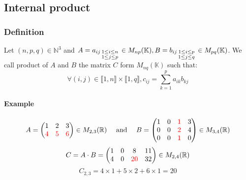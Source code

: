 \documentclass[notitlepage]{math}
\begin{document}
\subsection{Internal product}
\subsubsection{Definition}
Let $(n,p,q) \in \mathbb{N}^3$ and $A = {a_{ij}}_{\begin{smallmatrix} 1 \leq i \leq n \\ 1 \leq j \leq p \end{smallmatrix}} \in M_{np}(\mathbb{K}), B = {b_{ij}}_{\begin{smallmatrix}1 \leq i \leq p \\1 \leq j \leq q\end{smallmatrix}} \in M_{pq}(\mathbb{K})$.
We call product of $A$ and $B$ the matrix $C$ form $M_{nq}(\mathbb{K})$ such that:
\[ \forall (i,j) \in \llbracket 1,n \rrbracket \times \llbracket 1,q \rrbracket, c_{ij} = \sum_{k=1}^{p} a_{ik}b_{kj}\]

\paragraph{Example}
\[
    A = \begin{pmatrix}
        1 & 2 & 3 \\
        \color{red} 4 & \color{red}5 & \color{red}6
    \end{pmatrix} \in M_{2,3}(\mathbb{R}) \quad \text{ and } \quad B = \begin{pmatrix}
        1 & 0 & \color{red}1 & 3 \\
        0 & 0 & \color{red}2 & 4 \\
        0 & 0 & \color{red}1 & 0
    \end{pmatrix} \in M_{3,4}(\mathbb{R}) \]
    \[C = A \cdot B = \begin{pmatrix}
        1 & 0 & 8 & 11 \\
        4 & 0 & \color{red}20 & 32
    \end{pmatrix} \in M_{2,4}(\mathbb{R})\]
    \[ C_{2,3} = 4 \times 1 + 5 \times 2 + 6 \times 1 = 20 \] 
\end{document}
